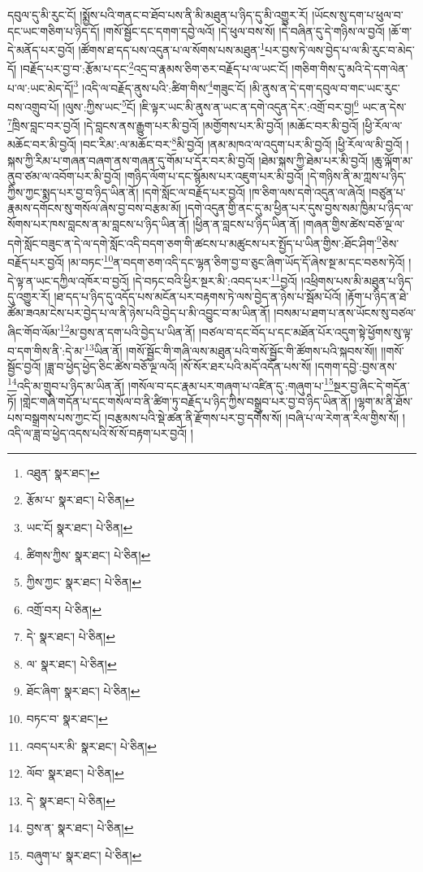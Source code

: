 དབུལ་དུ་མི་རུང་ངོ། །སྨྱོས་པའི་གནང་བ་ཐོབ་པས་ནི་མི་མཐུན་པ་ཉིད་དུ་མི་འགྱུར་རོ། །ཡོངས་སུ་དག་པ་ཕུལ་བ་དང་ཡང་གཅིག་པ་ཉིད་དོ། །གསོ་སྦྱོང་དང་དགག་དབྱེ་ལའོ། །དེ་ཕུལ་བས་སོ། །དེ་བཞིན་དུ་དེ་གཉིས་ལ་བྱའོ། །ཆོ་ག་དེ་མནོད་པར་བྱའོ། །ཚོགས་ཐ་དད་པས་འདུན་པ་ལ་སོགས་པས་མཐུན་\footnote{འཐུན་  སྣར་ཐང་། }པར་བྱས་ཏེ་ལས་བྱེད་པ་ལ་མི་རུང་བ་མེད་དོ། །བརྗོད་པར་བྱ་བ་:རྩོམ་པ་དང་\footnote{རྩོམ་པ་  སྣར་ཐང་།  པེ་ཅིན། }འདྲ་བ་རྣམས་ཅིག་ཅར་བརྗོད་པ་ལ་ཡང་ངོ། །གཅིག་གིས་དུ་མའི་དེ་དག་ལེན་པ་ལ་:ཡང་མེད་དོ།\footnote{ཡང་ངོ།  སྣར་ཐང་།  པེ་ཅིན། } །འདི་ལ་བརྗོད་ནུས་པའི་:ཚིག་གིས་\footnote{ཚིགས་ཀྱིས་  སྣར་ཐང་།  པེ་ཅིན། }གཟུང་ངོ། །མི་ནུས་ན་དེ་དག་དབུལ་བ་གང་ཡང་རུང་བས་འགྲུབ་པོ། །ལུས་:ཀྱིས་ཡང་\footnote{ཀྱིས་ཀྱང་  སྣར་ཐང་།  པེ་ཅིན། }ངོ། །ཇི་ལྟར་ཡང་མི་ནུས་ན་ཡང་ན་དགེ་འདུན་དེར་:འགྲོ་བར་བྱ།\footnote{འགྲོ་བར།  པེ་ཅིན། } ཡང་ན་དེས་\footnote{དེ་  སྣར་ཐང་།  པེ་ཅིན། }ཁྲིས་བླང་བར་བྱའོ། །དེ་བླངས་ནས་རྒྱུག་པར་མི་བྱའོ། །མགྱོགས་པར་མི་བྱའོ། །མཆོང་བར་མི་བྱའོ། །ཕྱི་རོལ་ལ་མཆོང་བར་མི་བྱའོ། །བང་རིམ་:ལ་མཆོང་བར་\footnote{ལ་  སྣར་ཐང་།  པེ་ཅིན། }མི་བྱའོ། །ནམ་མཁའ་ལ་འདུག་པར་མི་བྱའོ། །ཕྱི་རོལ་ལ་མི་བྱའོ། །སྐས་ཀྱི་རིམ་པ་གཞན་བཞག་ནས་གཞན་དུ་གོམ་པ་དོར་བར་མི་བྱའོ། །ཐེམ་སྐས་ཀྱི་ཐེམ་པར་མི་བྱའོ། །ཆུ་ལྐོག་མ་ནུབ་ཙམ་ལ་འབོག་པར་མི་བྱའོ། །གཉིད་ལོག་པ་དང་སྙོམས་པར་འཇུག་པར་མི་བྱའོ། །དེ་གཉིས་ནི་མ་ཀླས་པ་ཉིད་ཀྱིས་ཀྱང་སྨད་པར་བྱ་བ་ཉིད་ཡིན་ནོ། །དགེ་སློང་ལ་བརྗོད་པར་བྱའོ། །ཁ་ཅིག་ལས་དགེ་འདུན་ལ་ཞེའོ། །བཙུན་པ་རྣམས་དགོངས་སུ་གསོལ་ཞེས་བྱ་བས་བརྩམ་མོ། །དགེ་འདུན་གྱི་ནང་དུ་མ་ཕྱིན་པར་དུས་བྱས་སམ་ཁྱིམ་པ་ཉིད་ལ་སོགས་པར་ཁས་བླངས་ན་མ་བླངས་པ་ཉིད་ཡིན་ནོ། །ཕྱིན་ན་བླངས་པ་ཉིད་ཡིན་ནོ། །གཞན་གྱིས་ཚེས་བཅོ་ལྔ་ལ་དགེ་སློང་བཟུང་ན་དེ་ལ་དགེ་སློང་འདི་བདག་ཅག་གི་ཚངས་པ་མཚུངས་པར་སྤྱོད་པ་ཡིན་གྱིས་:ཐོང་ཤིག་\footnote{ཐོང་ཞིག་  སྣར་ཐང་།  པེ་ཅིན། }ཅེས་བརྗོད་པར་བྱའོ། །མ་བཏང་\footnote{བཏང་བ་  སྣར་ཐང་། }ན་བདག་ཅག་འདི་དང་ལྷན་ཅིག་བྱ་བ་ཅུང་ཞིག་ཡོད་དོ་ཞེས་སྔ་མ་དང་བཅས་ཏེའོ། །དེ་ལྟ་ན་ཡང་དཀྱིལ་འཁོར་བ་བྱའོ། །དེ་བཏང་བའི་ཕྱིར་སྔར་མི་:འབད་པར་\footnote{འབད་པར་མི་  སྣར་ཐང་།  པེ་ཅིན། }བྱའོ། །འཕྲིགས་པས་མི་མཐུན་པ་ཉིད་དུ་འགྱུར་རོ། །ཐ་དད་པ་ཉིད་དུ་འདོད་པས་མངོན་པར་བརྟགས་ཏེ་ལས་བྱེད་ན་ཉེས་པ་སྦོམ་པོའོ། །རྟོག་པ་ཉིད་ན་ཐེ་ཚོམ་ཟའམ་ངེས་པར་བྱེད་པ་ལ་ནི་ཉེས་པའི་བྱེད་པ་མི་འབྱུང་བ་མ་ཡིན་ནོ། །བསམ་པ་ཐག་པ་ནས་ཡོངས་སུ་བཙལ་ཞིང་གོབ་ལོམ་\footnote{ལོབ་  སྣར་ཐང་།  པེ་ཅིན། }མ་བྱས་ན་དག་པའི་བྱེད་པ་ཡིན་ནོ། །བཙལ་བ་དང་བོད་པ་དང་མཐོན་པོར་འདུག་སྟེ་ཕྱོགས་སུ་ལྟ་བ་དག་གིས་ནི་:དེ་མ་\footnote{དེ་  སྣར་ཐང་།  པེ་ཅིན། }ཡིན་ནོ། །གསོ་སྦྱོང་གི་གཞི་ལས་མཐུན་པའི་གསོ་སྦྱོང་གི་ཚོགས་པའི་སྐབས་སོ།། །།གསོ་སྦྱོང་བྱའོ། །ཟླ་བ་ཕྱེད་ཕྱེད་ཅིང་ཚེས་བཅོ་ལྔ་ལའོ། །སོ་སོར་ཐར་པའི་མདོ་འདོན་པས་སོ། །དགག་དབྱེ་:བྱས་ནས་\footnote{བྱས་ན་  སྣར་ཐང་།  པེ་ཅིན། }འདི་མ་གྲུབ་པ་ཉིད་མ་ཡིན་ནོ། །གསོལ་བ་དང་རྣམ་པར་གཞག་པ་འཛིན་དུ་:གཞུག་པ་\footnote{བཞུག་པ་  སྣར་ཐང་།  པེ་ཅིན། }སྔར་བྱ་ཞིང་དེ་གདོན་ཏོ། །གླེང་གཞི་གདོན་པ་དང་གསོལ་བ་ནི་ཚིག་ཏུ་བརྗོད་པ་ཉིད་ཀྱིས་བསྒྲུབ་པར་བྱ་བ་ཉིད་ཡིན་ནོ། །ལྷག་མ་ནི་ཐོས་པས་བསྒྲགས་པས་ཀྱང་ངོ། །བརྩམས་པའི་སྡེ་ཚན་ནི་རྫོགས་པར་བྱ་དགོས་སོ། །བཞི་པ་ལ་རེག་ན་རིལ་གྱིས་སོ། །འདི་ལ་ཟླ་བ་ཕྱེད་འདས་པའི་སོ་སོ་བརྟག་པར་བྱའོ། །
